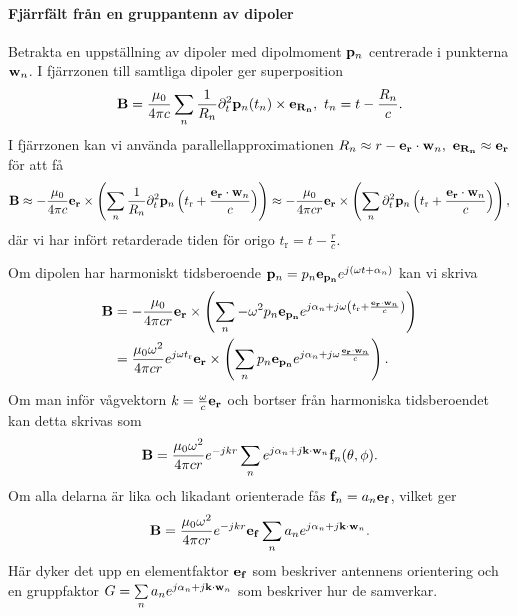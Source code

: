 \paragraph{Fjärrfält från en gruppantenn av dipoler}
Betrakta en uppställning av dipoler med dipolmoment $\vb{p}_{n}$ centrerade i punkterna $\vb{w}_{n}$. I fjärrzonen till samtliga dipoler ger superposition
\begin{align*}
	\vb{B} = \frac{\mu_{0}}{4\pi c}\sum\limits_{n}\frac{1}{R_{n}}\del[2]{t}{\vb{p}_{n}}(t_{n})\times\ub{R_{n}},\ t_{n} = t - \frac{R_ {n}}{c}.
\end{align*}
I fjärrzonen kan vi använda parallellapproximationen $R_{n} \approx r - \ub{r}\cdot\vb{w}_{n},\ \ub{R_{n}} \approx \ub{r}$ för att få
\begin{align*}
	\vb{B} \approx -\frac{\mu_{0}}{4\pi c}\ub{r}\times\left(\sum\limits_{n}\frac{1}{R_{n}}\del[2]{t}{\vb{p}_{n}}\left(t_{\text{r}} + \frac{\ub{r}\cdot\vb{w}_{n}}{c}\right)\right) \approx -\frac{\mu_{0}}{4\pi cr}\ub{r}\times\left(\sum\limits_{n}\del[2]{t}{\vb{p}_{n}}\left(t_{\text{r}} + \frac{\ub{r}\cdot\vb{w}_{n}}{c}\right)\right),
\end{align*}
där vi har infört retarderade tiden för origo $t_{\text{r}} = t - \frac{r}{c}$.

Om dipolen har harmoniskt tidsberoende $\vb{p}_{n} = p_{n}\ub{p_{n}}e^{j(\omega t + \alpha_{n})}$ kan vi skriva
\begin{align*}
	\vb{B} &= -\frac{\mu_{0}}{4\pi cr}\ub{r}\times\left(\sum\limits_{n}-\omega^{2}p_{n}\ub{p_{n}}e^{j\alpha_{n} + j\omega\left(t_{\text{r}} + \frac{\ub{r}\cdot\vb{w}_{n}}{c}\right)}\right) \\
	       &= \frac{\mu_{0}\omega^{2}}{4\pi cr}e^{j\omega t_{\text{r}}}\ub{r}\times\left(\sum\limits_{n}p_{n}\ub{p_{n}}e^{j\alpha_{n} + j\omega\frac{\ub{r}\cdot\vb{w}_{n}}{c}}\right).
\end{align*}
Om man inför vågvektorn $k = \frac{\omega}{c}\ub{r}$ och bortser från harmoniska tidsberoendet kan detta skrivas som
\begin{align*}
	\vb{B} = \frac{\mu_{0}\omega^{2}}{4\pi cr}e^{-jkr}\sum\limits_{n}e^{j\alpha_{n} + j\vb{k}\cdot\vb{w}_{n}}\vb{f}_{n}(\theta, \phi).
\end{align*}
Om alla delarna är lika och likadant orienterade fås $\vb{f}_{n} = a_{n}\ub{f}$, vilket ger
\begin{align*}
	\vb{B} = \frac{\mu_{0}\omega^{2}}{4\pi cr}e^{-jkr}\ub{f}\sum\limits_{n}a_{n}e^{j\alpha_{n} + j\vb{k}\cdot\vb{w}_{n}}.
\end{align*}
Här dyker det upp en elementfaktor $\ub{f}$ som beskriver antennens orientering och en gruppfaktor $G = \sum\limits_{n}a_{n}e^{j\alpha_{n} + j\vb{k}\cdot\vb{w}_{n}}$ som beskriver hur de samverkar.